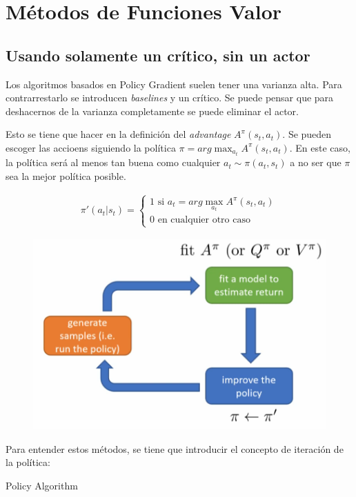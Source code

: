 \chapter{Métodos de Funciones Valor}%
\label{cha:value_function_methods}


\section{Usando solamente un crítico, sin un actor}%
\label{sec:usando_solamente_un_crítico_sin_un_actor}

Los algoritmos basados en Policy Gradient suelen tener una varianza alta. Para contrarrestarlo se
introducen \textit{baselines} y un crítico. Se puede pensar que para deshacernos de la
varianza completamente se puede eliminar el actor.

Esto se tiene que hacer en la definición del \textit{advantage} $A^\pi(s_t,a_t)$. Se pueden
escoger las accioens siguiendo la política $\pi = arg\max_{a_t} A^\pi(s_t,a_t)$. En este
caso, la política será al menos tan buena como cualquier $a_t\sim\pi(a_t,s_t)$ a no
ser que $\pi$ sea la mejor política posible.

\begin{align}
    \label{eq:detpol}
    \pi'(a_t|s_t) = \begin{cases}
        1 \text{ si } a_t = arg\max_{a_t}A^\pi(s_t,a_t)\\
        0 \textrm{ en cualquier otro caso }
    \end{cases}
\end{align}

\begin{figure}[htpb]
	\centering
	\includegraphics[width=0.5\linewidth]{figures/2020-06-15-110004_447x292_scrot.png}
\end{figure}

Para entender estos métodos, se tiene que introducir el concepto de iteración de la política:

\begin{algorithm}
    \caption{Policy Algorithm}
\end{algorithm}

